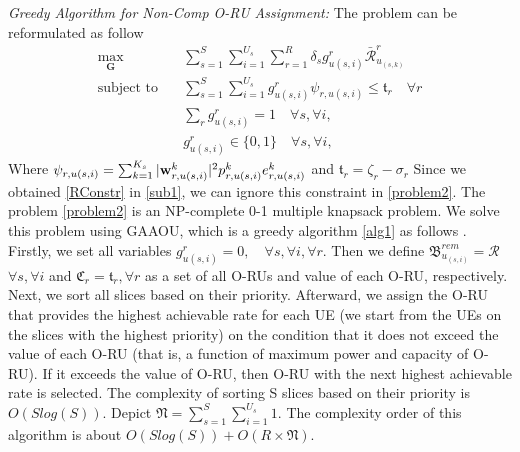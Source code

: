 \documentclass[conference]{IEEEtran}
\begin{document}
\textit{Greedy Algorithm for Non-Comp O-RU Assignment:}
The problem can be reformulated as follow
\begin{subequations}\label{problem2}
\begin{alignat}{4}
\max\limits_{ \boldsymbol{G} }   \quad &  \sum_{s=1}^S\sum_{i=1}^{U_s}\sum_{r=1}^{R} \delta_s g^r_{u(s,i)}\bar{\mathcal{R}}^r_{u_{(s,k)}} \ \\
\text{subject to} \quad  & \sum_{s=1}^{S}\sum_{i=1}^{U_s} g_{u(s,i)}^r \psi_{r,u(s,i)}\leq \mathfrak{t}_r \quad \forall r
 \label{p11} \\
& \sum_{r}g^r_{u(s,i)} = 1  \quad \forall s,\forall i, \label{p12}\\
 & g^r_{u(s,i)} \in \{0,1\} \quad \forall s,\forall i, \label{p13}  
\end{alignat}
\end{subequations}
Where $ \psi_{r,u(s,i)}=\sum_{k=1}^{K_s}|\bold{w}_{r,u(s,i)}^{k}|^2 p_{r,u(s,i)}^{k}  e^k_{r,u(s,i)}$
and $\mathfrak{t}_r = \zeta_r- \sigma_r$
Since we obtained \eqref{RConstr} in \eqref{sub1}, we can ignore this constraint in \eqref{problem2}.
The problem \eqref{problem2} is an NP-complete 0-1 multiple knapsack problem.  
We solve this problem using GAAOU, which is a greedy algorithm \eqref{alg1} as follows \cite{akccay2007greedy,lee2018dynamic}.
Firstly, we set all variables $g^r_{u(s,i)} = 0, \quad \forall s, \forall i, \forall r$. 
Then we define ${\mathfrak{B}}^{rem}_{u_{(s,i)}} = \mathcal{R}$  $\forall s, \forall i$ and $ \mathfrak{C}_r = \mathfrak{t}_r, \forall r$
as a set of all O-RUs and value of each O-RU, respectively.
Next, we sort all slices based on their priority. 
Afterward, we assign the O-RU that provides the highest achievable rate for each UE (we start from the UEs on the slices with the highest priority) on the condition that 
it does not exceed the value of each O-RU (that is, a function of maximum power and capacity of O-RU).
If it exceeds the value of O-RU, then O-RU with the next highest achievable rate is selected. 
The complexity of sorting S slices based on their priority is $O(Slog(S))$.
Depict $\mathfrak{N} =  \sum_{s=1}^S\sum_{i=1}^{U_s} 1$. 
The complexity order of this algorithm is about $O(Slog(S)) + O(R\times \mathfrak{N})$.
\end{document}
